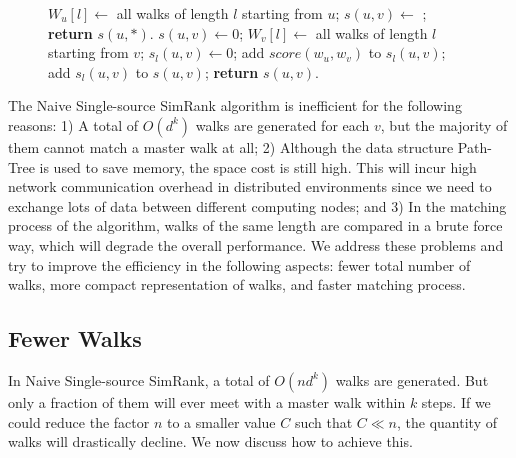 \documentclass[conference]{IEEEtran}
\theoremstyle{definition}
\theoremstyle{definition}
\begin{document}
\begin{figure}
\begin{algorithm}[H]
\label{alg:one}
\begin{algorithmic}[1]
		\State $W_u[l] \gets $ all walks of length $l$ starting from $u$;
	\EndFor
		\State $s(u,v)\gets$  ;
	\EndFor
	\State \textbf{return} $s(u, *)$.
\EndProcedure
{}
\State $s(u, v) \gets 0$;
	\State $W_v[l] \gets $ all walks of length $l$ starting from $v$;
	\State $s_l(u, v) \gets 0$;
			\State add  $score(w_u, w_v)$ to  $s_l(u, v)$;
		\EndIf
		\EndFor
	\EndFor
	\State add $s_l(u, v)$ to $s(u, v)$;
\EndFor
\State \textbf{return} $s(u, v)$.
\EndProcedure
\end{algorithmic}
\end{algorithm}
\end{figure}
The Naive Single-source SimRank algorithm is inefficient for the following reasons: 
1)   A total of $O(d^k)$ walks are generated for each $v$,  but the  majority of them cannot match a master walk at all;
2) Although  the data structure Path-Tree is used to save memory, the space cost is still  high. 
 This will incur high network communication overhead in distributed environments since we need to exchange lots of data  between different computing nodes; and
3) In the matching process of the algorithm, walks of the same length are compared in a brute force way, which will degrade the overall performance.
We address these problems and try to improve the efficiency in the following aspects: fewer total number of walks, more compact representation of walks, and faster matching process. 

\subsection{Fewer Walks}
In Naive Single-source SimRank,  a total of $O(nd^k)$ walks are generated. 
But only a fraction of them will ever meet with a master walk within $k$ steps. 
If we could reduce the factor $n$ to a smaller value  $C$ such that $C \ll n$, the quantity of walks will  drastically decline.
We now discuss  how to achieve this. 
\end{document}
